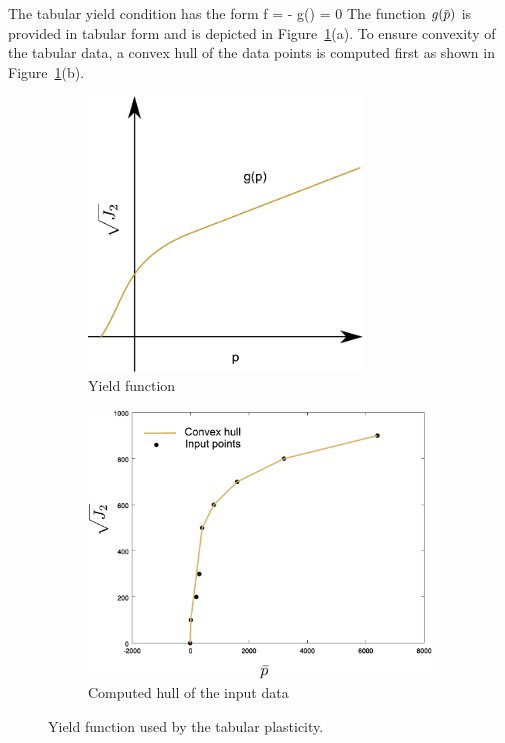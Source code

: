 The tabular yield condition has the form
\Beq
  f =  - g(\pbar) = 0
\Eeq
The function $g(\pbar)$ is provided in tabular form and is depicted in 
Figure~\ref{fig:tabular_yield_function}(a). 
To ensure convexity of the tabular data, a convex hull of the data points is computed
first as shown in Figure~\ref{fig:tabular_yield_function}(b).
\begin{figure}[htbp!]
  \begin{subfigure}[t]{0.5\textwidth}
    \includegraphics[width=0.8\textwidth]{Figs/tabular/TabularYieldFn.pdf}
    \caption{Yield function}
  \end{subfigure}
  \begin{subfigure}[t]{0.5\textwidth}
    \includegraphics[width=\textwidth]{Figs/tabular/tabular_yield_hull.pdf}
    \caption{Computed hull of the input data}
  \end{subfigure}
  \caption{Yield function used by the tabular plasticity.}
  \label{fig:tabular_yield_function}
\end{figure}

